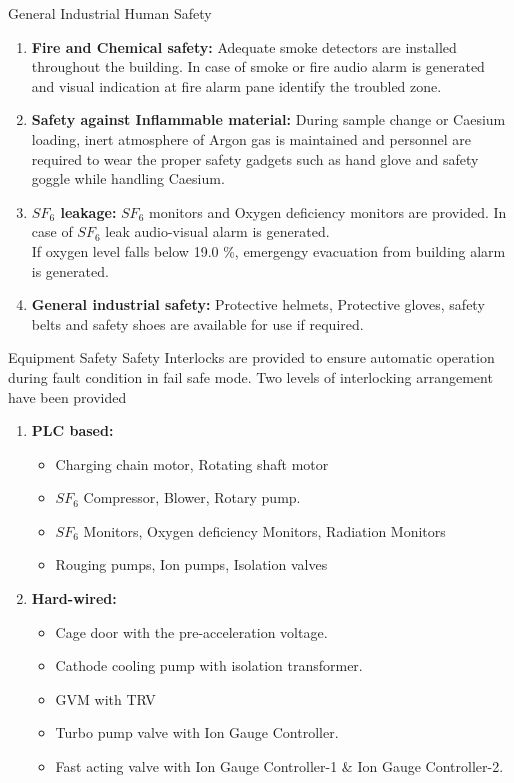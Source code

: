 \documentclass[11pt]{beamer}
\begin{document}
\begin{frame}{General Industrial Human Safety}

\begin{enumerate} 
 \item \textbf{Fire and Chemical safety:}
  Adequate  smoke detectors are installed  throughout the building. In case of smoke or fire audio alarm is generated and visual indication   at fire alarm pane identify the troubled zone.
 \item \textbf{Safety against Inflammable material:}
 During sample change or Caesium loading, inert atmosphere of Argon gas is maintained and personnel are required to wear the proper safety gadgets such as hand glove and safety goggle while handling Caesium.
 \item \textbf{$SF_6$ leakage:}
 $SF_6$ monitors and Oxygen deficiency monitors are provided. In case of $SF_6$  leak audio-visual alarm is generated.\\
  If oxygen level falls below 19.0 \%,  emergengy evacuation from building alarm is generated.
\item \textbf{General industrial safety:}
Protective helmets, Protective gloves, safety belts and safety shoes are available for use if required.
\end{enumerate}		
 
\end{frame}


\begin{frame}{Equipment Safety}
Safety Interlocks are provided to ensure automatic operation during fault condition in fail safe mode. Two levels of interlocking arrangement have been provided 
\begin{enumerate} 
 \item \textbf{PLC based:}
  \begin{itemize}
  \item  Charging chain  motor, Rotating shaft motor
  \item  $SF_6$  Compressor, Blower, Rotary pump.
  \item  $SF_6$  Monitors, Oxygen deficiency Monitors, Radiation Monitors
  \item  Rouging pumps, Ion pumps, Isolation valves 
  \end{itemize} 
 \item \textbf{Hard-wired:}
\begin{itemize}
\item  Cage door with the pre-acceleration voltage.
\item  Cathode cooling pump with isolation transformer.
\item  GVM with TRV
\item  Turbo pump valve with Ion Gauge Controller.
\item  Fast acting valve with Ion Gauge Controller-1 \& Ion Gauge Controller-2.
\end{itemize} 
\end{enumerate}		
	 
 
\end{frame}
\end{document}
